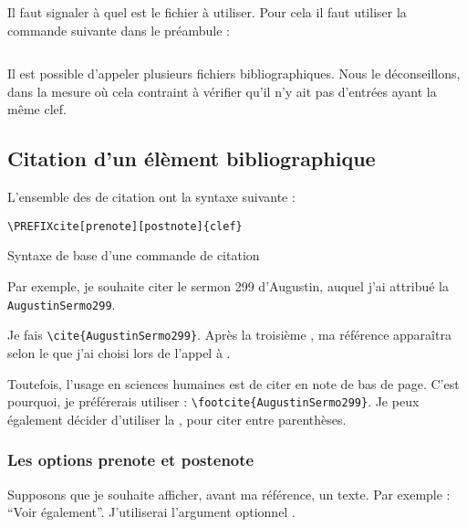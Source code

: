 Il faut signaler à  quel est le fichier  à utiliser. Pour cela il faut utiliser la commande suivante dans le préambule :

\begin{verbatim}

\end{verbatim}

\begin{attention}
Il est possible d'appeler plusieurs fichiers bibliographiques. Nous le déconseillons, dans la mesure où cela contraint à vérifier qu'il n'y ait pas d'entrées ayant la même clef.
\end{attention}

\subsection{Citation d'un élèment bibliographique}

L'ensemble des  de citation ont la syntaxe suivante : 

\begin{listing}[ht]
\begin{verbatim}
\PREFIXcite[prenote][postnote]{clef}
\end{verbatim}
\caption{Syntaxe de base d'une commande de citation}
\end{listing}

Par exemple, je souhaite citer le sermon 299 d'Augustin, auquel j'ai attribué la  \verb|AugustinSermo299|.

Je fais \verb|\cite{AugustinSermo299}|. Après la troisième , ma référence apparaîtra selon le  que j'ai choisi lors de l'appel à  .

Toutefois, l'usage en sciences humaines est de citer en note de bas de page. C'est pourquoi, je préférerais utiliser : \verb|\footcite{AugustinSermo299}|. Je peux également décider d'utiliser la  , pour citer entre parenthèses.

\subsubsection{Les options prenote et postenote}

Supposons que je souhaite afficher, avant ma référence, un texte. Par exemple : \enquote{Voir également}. J'utiliserai l'argument optionnel .

